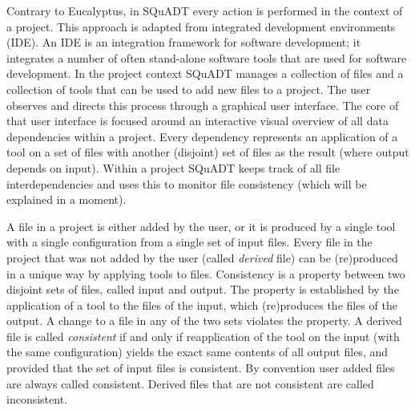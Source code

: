 \documentclass{article}
\newcommand{\squadt}{SQuADT\xspace}
\begin{document}
  
  Contrary to Eucalyptus, in \squadt every action is performed in the context
  of a project. This approach is adapted from integrated development
  environments (IDE).  An IDE is an integration framework for software
  development; it integrates a number of often stand-alone software tools that
  are used for software development. In the project context \squadt manages a
  collection of files and a collection of tools that can be used to add new
  files to a project. The user observes and directs this process through a
  graphical user interface.  The core of that user interface is focused around
  an interactive visual overview of all data dependencies within a project.
  Every dependency represents an application of a tool on a set of files with
  another (disjoint) set of files as the result (where output depends on
  input).  Within a project \squadt keeps track of all file interdependencies
  and uses this to monitor file consistency (which will be explained in a moment).

  A file in a project is either added by the user, or it is produced by a
  single tool with a single configuration from a single set of input files.
  Every file in the project that was not added by the user (called
  \textit{derived} file) can be (re)produced in a unique way by applying tools
  to files. Consistency is a property between two disjoint sets of files,
  called input and output. The property is established by the application of a
  tool to the files of the input, which (re)produces the files of the output. A
  change to a file in any of the two sets violates the property. A derived file
  is called \textit{consistent} if and only if reapplication of the tool on the
  input (with the same configuration) yields the exact same contents of all
  output files, and provided that the set of input files is consistent. By
  convention user added files are always called consistent. Derived files that
  are not consistent are called inconsistent.
  
\end{document}
